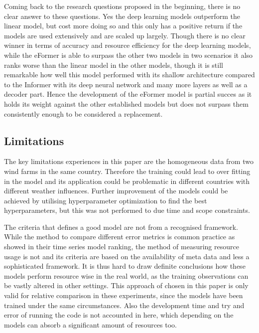 \documentclass{article}
\begin{document}
Coming back to the research questions proposed in the beginning, there is no clear answer to these questions. Yes the deep learning models outperform the linear model, but cost more doing so and this only has a positive return if the models are used extensively and are scaled up largely. Though there is no clear winner in terms of accuracy and resource efficiency for the deep learning models, while the eFormer is able to surpass the other two models in two scenarios it also ranks worse than the linear model in the other models, though it is still remarkable how well this model performed with its shallow architecture compared to the Informer with its deep neural network and many more layers as well as a decoder part. Hence the development of the eFormer model is partial succes as it holds its weight against the other established models but does not surpass them consistently enough to be considered a replacement.

\subsection{Limitations}

The key limitations experiences in this paper are the homogeneous data from two wind farms in the same country. Therefore the training could lead to over fitting in the model and its application could be problematic in different countries with different weather influences. Further improvement of the models could be achieved by utilising hyperparameter optimization to find the best hyperparameters, but this was not performed to due time and scope constraints. 

The criteria that defines a good model are not from a recognised framework. While the method to compare different error metrics is common practice as \cite{TS-ranking} showed in their time series model ranking, the method of measuring resource usage is not and its criteria are based on the availability of meta data and less a sophisticated framework. It is thus hard to draw definite conclusions how these models perform resource wise in the real world, as the training observations can be vastly altered in other settings. This approach of chosen in this paper is only valid for relative comparison in these experiments, since the models have been trained under the same circumstances. Also the development time and try and error of running the code is not accounted in here, which depending on the models can absorb a significant amount of resources too. 
\end{document}

